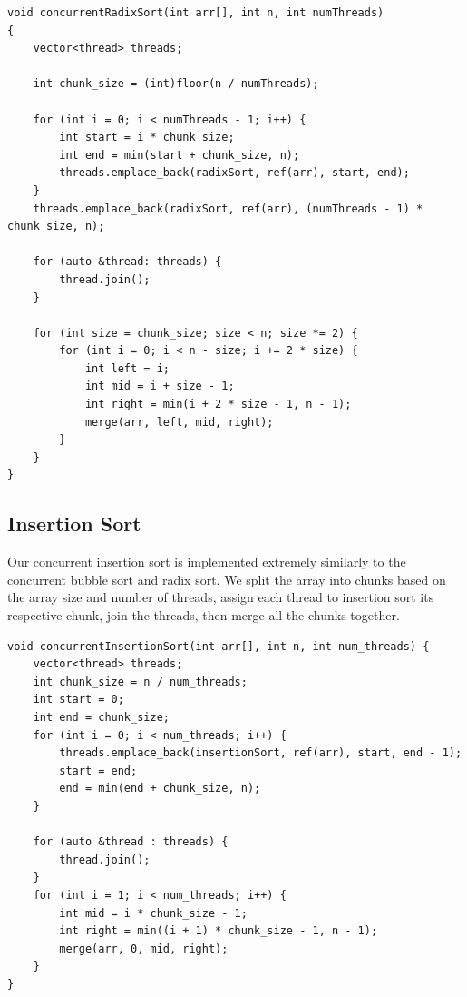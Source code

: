 \documentclass[conference]{IEEEtran}
\begin{document}
\begin{lstlisting}
void concurrentRadixSort(int arr[], int n, int numThreads)
{
    vector<thread> threads;
    
    int chunk_size = (int)floor(n / numThreads);

    for (int i = 0; i < numThreads - 1; i++) {
        int start = i * chunk_size;
        int end = min(start + chunk_size, n);
        threads.emplace_back(radixSort, ref(arr), start, end);
    }
    threads.emplace_back(radixSort, ref(arr), (numThreads - 1) * chunk_size, n);
    
    for (auto &thread: threads) {
        thread.join();
    }

    for (int size = chunk_size; size < n; size *= 2) {
        for (int i = 0; i < n - size; i += 2 * size) {
            int left = i;
            int mid = i + size - 1;
            int right = min(i + 2 * size - 1, n - 1);
            merge(arr, left, mid, right);
        }
    }
}
\end{lstlisting}

\subsection{Insertion Sort}
Our concurrent insertion sort is implemented extremely similarly to the concurrent bubble sort and radix sort. We split the array into chunks based on the array size and number of threads, assign each thread to insertion sort its respective chunk, join the threads, then merge all the chunks together.

\begin{lstlisting}
void concurrentInsertionSort(int arr[], int n, int num_threads) {
    vector<thread> threads;
    int chunk_size = n / num_threads;
    int start = 0;
    int end = chunk_size;
    for (int i = 0; i < num_threads; i++) {
        threads.emplace_back(insertionSort, ref(arr), start, end - 1);
        start = end;
        end = min(end + chunk_size, n);
    }

    for (auto &thread : threads) {
        thread.join();
    }
    for (int i = 1; i < num_threads; i++) {
        int mid = i * chunk_size - 1;
        int right = min((i + 1) * chunk_size - 1, n - 1);
        merge(arr, 0, mid, right);
    }
}
\end{lstlisting}
\end{document}
